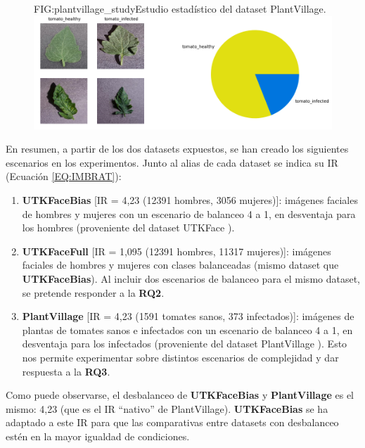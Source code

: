 \begin{figure}[Estudio PlantVillage]{FIG:plantvillage_study}{Estudio estadístico del dataset PlantVillage.}
    \centering
    \includegraphics[width=12cm]{img/plantvillage_dist.png}
\end{figure}

En resumen, a partir de los dos datasets expuestos, se han creado los siguientes escenarios en los experimentos. Junto al alias de cada dataset se indica su IR (Ecuación \ref{EQ:IMBRAT}):

\begin{enumerate}
    \fontsize{11pt}{12pt}\selectfont
    \item \textbf{UTKFaceBias} [IR = 4,23 (12391 hombres, 3056 mujeres)]: imágenes faciales de hombres y mujeres con un escenario de balanceo 4 a 1, en desventaja para los hombres (proveniente del dataset UTKFace \cite{UTKFACE,zhifei2017cvpr}).
    \item \textbf{UTKFaceFull} [IR = 1,095 (12391 hombres, 11317 mujeres)]: imágenes faciales de hombres y mujeres con clases balanceadas (mismo dataset que \textbf{UTKFaceBias}). Al incluir dos escenarios de balanceo para el mismo dataset, se pretende responder a la \textbf{RQ2}.
    \item \textbf{PlantVillage} [IR = 4,23 (1591	tomates sanos, 373 infectados)]: imágenes de plantas de tomates sanos e infectados con un escenario de balanceo 4 a 1, en desventaja para los infectados (proveniente del dataset PlantVillage \cite{hughes2015open}). Esto nos permite experimentar sobre distintos escenarios de complejidad y dar respuesta a la \textbf{RQ3}.
\end{enumerate}

Como puede observarse, el desbalanceo de \textbf{UTKFaceBias} y \textbf{PlantVillage} es el mismo: 4,23 (que es el IR ``nativo'' de PlantVillage). \textbf{UTKFaceBias} se ha adaptado a este IR para que las comparativas entre datasets con desbalanceo estén en la mayor igualdad de condiciones.



